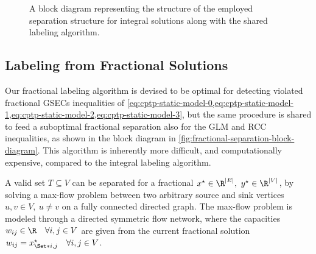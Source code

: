 \begin{figure}[ht]
	\centering
	\caption{A block diagram representing the structure
		of the employed separation structure for integral solutions
		along with the shared labeling algorithm.
	}
	\label{fig:integral-separation-block-diagram}
\end{figure}

\subsection{Labeling from Fractional Solutions}
\label{sec:impl-labeling-fractional-solutions}

Our fractional labeling algorithm is devised to be optimal for
detecting violated fractional GSECs inequalities
of \cref{eq:cptp-static-model-0,eq:cptp-static-model-1,eq:cptp-static-model-2,eq:cptp-static-model-3},
but the same procedure is shared
to feed a suboptimal fractional separation also for the GLM and RCC inequalities,
as shown in the block diagram in \cref{fig:fractional-separation-block-diagram}.
This algorithm is inherently more difficult, and computationally expensive,
compared to the integral labeling algorithm.

A valid set $T \subseteq V$ can be separated for a fractional $x^\star \in \R^{|E|},\ y^\star \in \R^{|V|}$,
by solving a
max-flow problem between two arbitrary source and sink vertices $u, v \in V,\ u \ne v$ on a fully connected directed graph.
The max-flow problem is modeled through a directed symmetric flow network,
where the capacities $w_{ij} \in \R \quad \forall i, j \in V$
are given from the current fractional solution $w_{ij} = x^\star_{\Set*{i, j}} \quad \forall i, j \in V$.

